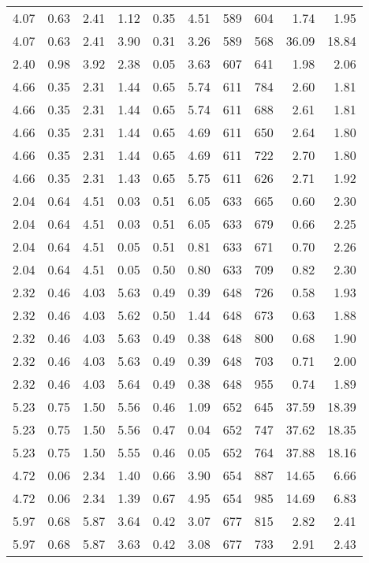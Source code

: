 \begin{longtable}{rrrrrrrrrr}
4.07	&	0.63	&	2.41	&	1.12	&	0.35	&	4.51	&	589	&	604	&	1.74	&	1.95	\\
4.07	&	0.63	&	2.41	&	3.90	&	0.31	&	3.26	&	589	&	568	&	36.09	&	18.84	\\
2.40	&	0.98	&	3.92	&	2.38	&	0.05	&	3.63	&	607	&	641	&	1.98	&	2.06	\\
4.66	&	0.35	&	2.31	&	1.44	&	0.65	&	5.74	&	611	&	784	&	2.60	&	1.81	\\
4.66	&	0.35	&	2.31	&	1.44	&	0.65	&	5.74	&	611	&	688	&	2.61	&	1.81	\\
4.66	&	0.35	&	2.31	&	1.44	&	0.65	&	4.69	&	611	&	650	&	2.64	&	1.80	\\
4.66	&	0.35	&	2.31	&	1.44	&	0.65	&	4.69	&	611	&	722	&	2.70	&	1.80	\\
4.66	&	0.35	&	2.31	&	1.43	&	0.65	&	5.75	&	611	&	626	&	2.71	&	1.92	\\
2.04	&	0.64	&	4.51	&	0.03	&	0.51	&	6.05	&	633	&	665	&	0.60	&	2.30	\\
2.04	&	0.64	&	4.51	&	0.03	&	0.51	&	6.05	&	633	&	679	&	0.66	&	2.25	\\
2.04	&	0.64	&	4.51	&	0.05	&	0.51	&	0.81	&	633	&	671	&	0.70	&	2.26	\\
2.04	&	0.64	&	4.51	&	0.05	&	0.50	&	0.80	&	633	&	709	&	0.82	&	2.30	\\
2.32	&	0.46	&	4.03	&	5.63	&	0.49	&	0.39	&	648	&	726	&	0.58	&	1.93	\\
2.32	&	0.46	&	4.03	&	5.62	&	0.50	&	1.44	&	648	&	673	&	0.63	&	1.88	\\
2.32	&	0.46	&	4.03	&	5.63	&	0.49	&	0.38	&	648	&	800	&	0.68	&	1.90	\\
2.32	&	0.46	&	4.03	&	5.63	&	0.49	&	0.39	&	648	&	703	&	0.71	&	2.00	\\
2.32	&	0.46	&	4.03	&	5.64	&	0.49	&	0.38	&	648	&	955	&	0.74	&	1.89	\\
5.23	&	0.75	&	1.50	&	5.56	&	0.46	&	1.09	&	652	&	645	&	37.59	&	18.39	\\
5.23	&	0.75	&	1.50	&	5.56	&	0.47	&	0.04	&	652	&	747	&	37.62	&	18.35	\\
5.23	&	0.75	&	1.50	&	5.55	&	0.46	&	0.05	&	652	&	764	&	37.88	&	18.16	\\
4.72	&	0.06	&	2.34	&	1.40	&	0.66	&	3.90	&	654	&	887	&	14.65	&	6.66	\\
4.72	&	0.06	&	2.34	&	1.39	&	0.67	&	4.95	&	654	&	985	&	14.69	&	6.83	\\
5.97	&	0.68	&	5.87	&	3.64	&	0.42	&	3.07	&	677	&	815	&	2.82	&	2.41	\\
5.97	&	0.68	&	5.87	&	3.63	&	0.42	&	3.08	&	677	&	733	&	2.91	&	2.43	\\

\end{longtable}
